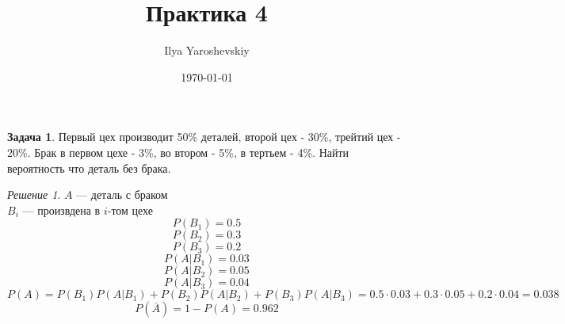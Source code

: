 \documentclass[english]{article}
\author{Ilya Yaroshevskiy}
\date{\today}
\title{Практика 4}
\theoremstyle{plain}
\theoremstyle{remark}
\newtheorem*{solution}{Решение}
\theoremstyle{definition}
\newtheorem{task}{Задача}
\begin{document}
\maketitle
\tableofcontents

\begin{task}
Первый цех производит 50\% деталей, второй цех - 30\%, трейтий цех -
20\%. Брак в первом цехе - 3\%, во втором - 5\%, в тертьем - 4\%. Найти
вероятность что деталь без брака.
\end{task}
\begin{solution}
\(A\) --- деталь с браком \\
\(B_i\) --- произвдена в \(i\text{-том}\) цехе
\[ P(B_1) = 0.5 \]
\[ P(B_2) = 0.3 \]
\[ P(B_3) = 0.2 \]
\[ P(A|B_1) = 0.03 \]
\[ P(A|B_2) = 0.05 \]
\[ P(A|B_3) = 0.04 \]
\[ P(A) = P(B_1)P(A|B_1) + P(B_2)P(A|B_2) + P(B_3)P(A|B_3) = 0.5\cdot0.03 + 0.3\cdot0.05 + 0.2\cdot0.04 = 0.038 \]
\[ P(\overline{A}) = 1 - P(A) = 0.962 \]
\end{solution}
\end{document}
